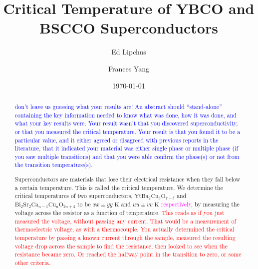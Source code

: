 \documentclass[prb,preprint]{revtex4-1}
\begin{document}

\title{Critical Temperature of YBCO and BSCCO Superconductors}

\author{Ed Lipchus}



\author{Frances Yang}


\date{\today}

\begin{abstract}

\textcolor{blue}{don't leave us guessing what your results are! An abstract should ``stand-alone'' containing the key information needed to know what was done, how it was done, and what your key results were. Your result wasn't that you discovered superconductivity, or that you measured the critical temperature. Your result is that you found it to be a particular value, and it either agreed or disagreed with previous reports in the literature, that it indicated your material was either single phase or multiple phase (if you saw multiple transitions) and that you were able confirm the phase(s) or not from the transition temperature(s).} 

Superconductors are materials that lose their electrical resistance  when they fall below a certain temperature. This is called the critical temperature. We determine the critical temperatures of two superconductors,  $\textrm{Yt}\textrm{Ba}_{2}\textrm{Cu}_{3}\textrm{O}_{7-\delta}$ and $\textrm{Bi}_{2}\textrm{Sr}_{2}\textrm{Ca}_{n-1}\textrm{Cu}_{n}\textrm{O}_{2n+4}$ to be $xx \pm yy \textrm{ K}$ and $uu \pm vv \textrm{ K}$\textcolor{magenta}{ respectively}, by measuring the voltage across the resistor as a function of temperature. \textcolor{red}{This reads as if you just measured the voltage, without passing any current. That would be a measurement of thermoelectric voltage, as with a thermocouple. You actually determined the critical temperature by passing a known current through the sample, measured the resulting voltage drop across the sample to find the resistance, then looked to see when the resistance became zero. Or reached the halfway point in the transition to zero. or some other criteria. }



\end{abstract}
\end{document}

